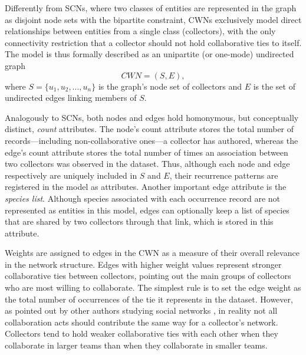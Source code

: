 {Differently from SCNs, where two classes of entities are represented in the graph as disjoint node sets with the bipartite constraint, CWNs exclusively model direct relationships between entities from a single class (collectors), with the only connectivity restriction that a collector should not hold collaborative ties to itself.
The model is thus formally described as an unipartite (or one-mode) undirected graph
$$CWN = (S,E),$$
where $S=\{u_1,u_2,...,u_n\}$ is the graph's node set of collectors and $E$ is the set of undirected edges linking members of $S$.

Analogously to SCNs, both nodes and edges hold homonymous, but conceptually distinct, \textit{count} attributes.
The node's count attribute stores the total number of records---including non-collaborative ones---a collector has authored, whereas
the edge's count attribute stores the total number of times an association between two collectors was observed in the dataset. Thus, although each node and edge respectively are uniquely included in $S$ and $E$, their recurrence patterns are registered in the model as attributes.
Another important edge attribute is the \textit{species list}. Although species associated with each occurrence record are not represented as entities in this model, edges can optionally keep a list of species that are shared by two collectors through that link, which is stored in this attribute.

Weights are assigned to edges in the CWN as a measure of their overall relevance in the network structure. Edges with higher weight values represent stronger collaborative ties between collectors, pointing out the main groups of collectors who are most willing to collaborate. 
The simplest rule is to set the edge weight as the total number of occurrences of the tie it represents in the dataset. However, as pointed out by other authors studying social networks \cite{Newman2001a}, in reality not all collaboration acts should contribute the same way for a collector's network. 
Collectors tend to hold weaker collaborative ties with each other when they collaborate in larger teams than when they collaborate in smaller teams. 

}
